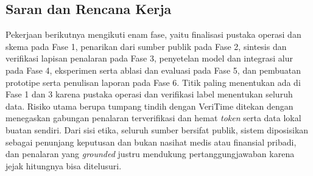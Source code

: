 \documentclass[10pt,a4paper,twocolumn]{article}
\begin{document}
\subsection{Saran dan Rencana Kerja}
Pekerjaan berikutnya mengikuti enam fase, yaitu finalisasi pustaka operasi dan
skema pada Fase 1, penarikan dari sumber publik pada Fase 2, sintesis dan
verifikasi lapisan penalaran pada Fase 3, penyetelan model dan integrasi alur
pada Fase 4, eksperimen serta ablasi dan evaluasi pada Fase 5, dan pembuatan
prototipe serta penulisan laporan pada Fase 6. Titik paling menentukan ada di
Fase 1 dan 3 karena pustaka operasi dan verifikasi label menentukan seluruh
data. Risiko utama berupa tumpang tindih dengan VeriTime ditekan dengan
menegaskan gabungan penalaran terverifikasi dan hemat \textit{token} serta data
lokal buatan sendiri. Dari sisi etika, seluruh sumber bersifat publik, sistem
diposisikan sebagai penunjang keputusan dan bukan nasihat medis atau finansial
pribadi, dan penalaran yang \textit{grounded} justru mendukung
pertanggungjawaban karena jejak hitungnya bisa ditelusuri.
\end{document}
